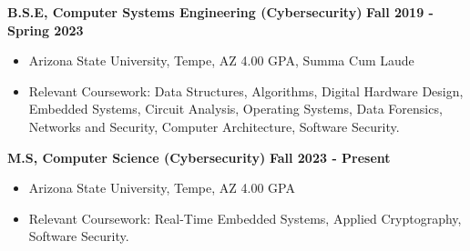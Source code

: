 \textbf{B.S.E, Computer Systems Engineering (Cybersecurity)} \hfill \textbf{Fall 2019 - Spring 2023}
\begin{itemize}
    \setlength{\itemsep}{0pt} %
    \setlength{\parskip}{0pt} %
    \item{Arizona State University, Tempe, AZ \hfill 4.00 GPA, Summa Cum Laude}
    \item{Relevant Coursework: Data Structures, Algorithms, Digital Hardware Design, Embedded Systems, Circuit Analysis, Operating Systems, Data Forensics, Networks and Security, Computer Architecture, Software Security.}
\end{itemize}

\vspace{0.3em}

\textbf{M.S, Computer Science (Cybersecurity)} \hfill \textbf{Fall 2023 - Present}
\begin{itemize}
    \setlength{\itemsep}{0pt} %
    \setlength{\parskip}{0pt} %
    \item{Arizona State University, Tempe, AZ \hfill 4.00 GPA}
    \item{Relevant Coursework: Real-Time Embedded Systems, Applied Cryptography, Software Security.}
\end{itemize}
